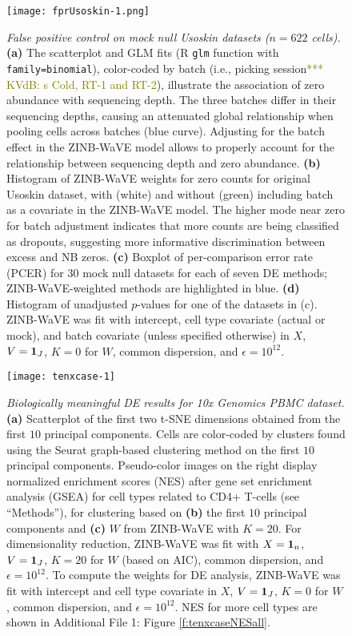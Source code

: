 \documentclass{bmcart}
\newcommand{\RPack}[1]{\textsf{#1}}
\newcommand{\RCmd}[1]{\texttt{#1}}
\newcommand{\RObj}[1]{\texttt{#1}}
\newcommand{\koen}[1]{\textcolor{olive}{*** KVdB: #1}}
\begin{document}
\begin{figure}[ht]
\begin{center}
\texttt{[image: fprUsoskin-1.png]}
\end{center}
\caption{{\em False positive control on mock null Usoskin datasets ($n=622$ cells).} 
\textbf{(a)} The scatterplot and GLM fits (R \RObj{glm} function with \RCmd{family=binomial}), color-coded by batch (i.e., picking session\koen{s Cold, RT-1 and RT-2}), illustrate the association of zero abundance with sequencing depth. The three batches differ in their sequencing depths, causing an attenuated global relationship when pooling cells across batches (blue curve). Adjusting for the batch effect in the ZINB-WaVE model allows to properly account for the relationship between sequencing depth and zero abundance. 
\textbf{(b)} Histogram of ZINB-WaVE weights for zero counts for original Usoskin dataset, with (white) and without (green) including batch as a covariate in the ZINB-WaVE model. The higher mode near zero for batch adjustment indicates that more counts are being classified as dropouts, suggesting more informative discrimination between excess and NB zeros. 
\textbf{(c)} Boxplot of per-comparison error rate (PCER) for $30$ mock null datasets for each of seven DE methods; ZINB-WaVE-weighted methods are highlighted in blue.
\textbf{(d)} Histogram of unadjusted $p$-values for one of the datasets in (c). ZINB-WaVE was fit with intercept, cell type covariate (actual or mock), and batch covariate (unless specified otherwise) in $X$, $V = {\bf 1}_J$, $K=0$ for $W$, common dispersion, and $\epsilon=10^{12}$. 
}
\label{f:fdrUsoskin}
\end{figure}


\begin{figure}[ht]
\begin{center}
\texttt{[image: tenxcase-1]}
\end{center}
\caption{{\em Biologically meaningful DE results for 10x Genomics PBMC dataset.}
{\bf (a)} Scatterplot of the first two t-SNE dimensions obtained from the first $10$ principal components. Cells are color-coded by clusters found using the \RPack{Seurat} graph-based clustering method on the first $10$ principal components. 
Pseudo-color images on the right display normalized enrichment scores (NES) after gene set enrichment analysis (GSEA) for cell types related to CD4+ T-cells (see ``Methods''), for clustering based on 
\textbf{(b)} the first $10$ principal components and 
\textbf{(c)} $W$ from ZINB-WaVE with $K=20$. 
For dimensionality reduction, ZINB-WaVE was fit with $X = {\bf 1}_n$, $V = {\bf 1}_J$, $K=20$ for $W$ (based on AIC), common dispersion, and $\epsilon=10^{12}$. To compute the weights for DE analysis, ZINB-WaVE was fit with intercept and cell type covariate in $X$, $V = {\bf 1}_J$, $K=0$ for $W$, common dispersion, and $\epsilon=10^{12}$.
NES for more cell types are shown in Additional File 1: Figure \ref{f:tenxcaseNESall}. 
}
\label{f:tenxcaseNES}
\end{figure}
\end{document}
